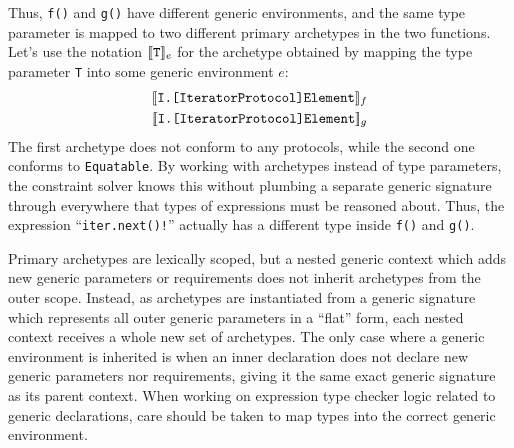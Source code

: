 \documentclass[../generics]{subfiles}
\begin{document}
Thus, \texttt{f()} and \texttt{g()} have different generic environments, and the same type parameter is mapped to two different primary archetypes in the two functions. Let's use the notation $[\![\texttt{T}]\!]_e$ for the archetype obtained by mapping the type parameter \texttt{T} into some generic environment $e$:
\begin{gather*}
\archetype{I.[IteratorProtocol]Element}_f\\
\archetype{I.[IteratorProtocol]Element}_g
\end{gather*}
The first archetype does not conform to any protocols, while the second one conforms to \texttt{Equatable}. By working with archetypes instead of type parameters, the constraint solver knows this without plumbing a separate generic signature through everywhere that types of expressions must be reasoned about. Thus, the expression ``\texttt{iter.next()!}'' actually has a different type inside \texttt{f()} and \texttt{g()}.

Primary archetypes are lexically scoped, but a nested generic context which adds new generic parameters or requirements does not inherit archetypes from the outer scope. Instead, as archetypes are instantiated from a generic signature which represents all outer generic parameters in a ``flat'' form, each nested context receives a whole new set of archetypes. The only case where a generic environment is inherited is when an inner declaration does not declare new generic parameters nor requirements, giving it the same exact generic signature as its parent context. When working on expression type checker logic related to generic declarations, care should be taken to map types into the correct generic environment.
\end{document}
